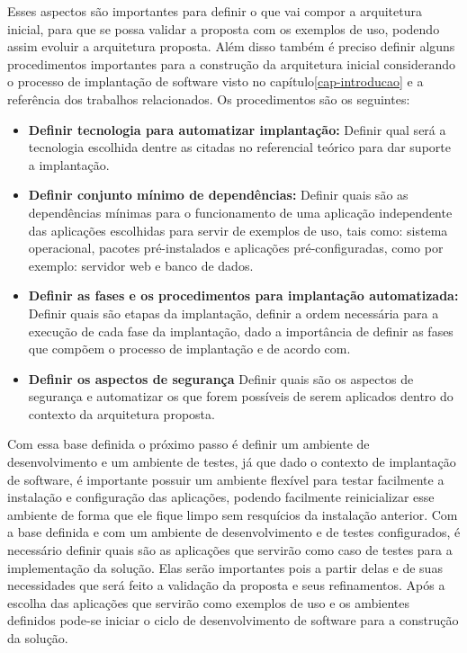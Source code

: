 Esses aspectos são importantes para definir o que vai compor a arquitetura inicial,
para que se possa validar a proposta com os exemplos de uso, podendo assim evoluir
a arquitetura proposta. Além disso também é preciso definir alguns procedimentos
importantes para a construção da arquitetura inicial considerando o processo de
implantação de software visto no capítulo\ref{cap-introducao} e a referência dos
trabalhos relacionados. Os procedimentos são os seguintes:

\begin{itemize}
  \item  \textbf{Definir tecnologia para automatizar implantação:}  Definir qual será a
  tecnologia escolhida dentre as citadas no referencial teórico para dar suporte
  a implantação.
  \item  \textbf{Definir conjunto mínimo de dependências:} Definir quais são as dependências
  mínimas para o funcionamento de uma aplicação independente das aplicações escolhidas para
  servir de exemplos de uso, tais como: sistema operacional, pacotes pré-instalados
  e aplicações pré-configuradas, como por exemplo: servidor web e banco de dados.
  \item  \textbf{Definir as fases e os procedimentos para implantação automatizada:}
   Definir quais são etapas da implantação, definir a ordem necessária para a execução de
  cada fase da implantação, dado a importância de definir as fases que compõem o processo de
  implantação e de acordo com\cite{omg2006}.
  \item  \textbf{Definir os aspectos de segurança} Definir quais são os aspectos de segurança
  e automatizar os que forem possíveis de serem aplicados dentro do contexto da arquitetura
  proposta.
\end{itemize}

Com essa base definida o próximo passo é definir um ambiente de desenvolvimento
e um ambiente de testes, já que dado o contexto de implantação de software,
é importante possuir um ambiente flexível para testar facilmente a instalação
e configuração das aplicações, podendo facilmente reinicializar esse ambiente de
forma que ele fique limpo sem resquícios da instalação anterior. Com a base definida
e com um ambiente de desenvolvimento e de testes configurados, é necessário definir
quais são as aplicações que servirão como caso de testes para a implementação da
solução. Elas serão importantes pois a partir delas e de suas necessidades que será
feito a validação da proposta e seus refinamentos. Após a escolha das aplicações
que servirão como exemplos de uso e os ambientes definidos pode-se iniciar o
ciclo de desenvolvimento de software para a construção da solução.

